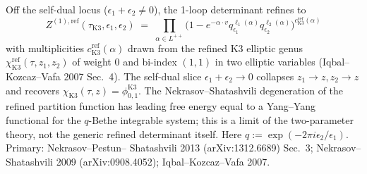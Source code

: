 \begin{remark}
\label{rem:feyn-W15-refinement}
Off the self-dual locus ($\epsilon_1 + \epsilon_2 \neq 0$), the
1-loop determinant refines to
\[
Z^{(1), \mathrm{ref}}(\tau_{\mathrm K3}, \epsilon_1, \epsilon_2)
 \;=\; \prod_{\alpha \in L^{++}}
 \bigl(1 - e^{-\alpha\cdot v} q_{\epsilon_1}^{\ell_1(\alpha)}
 q_{\epsilon_2}^{\ell_2(\alpha)}\bigr)^{c^{\mathrm{ref}}_{\mathrm K3}(\alpha)}
\]
with multiplicities $c^{\mathrm{ref}}_{\mathrm K3}(\alpha)$ drawn from
the refined K3 elliptic genus
$\chi^{\mathrm{ref}}_{\mathrm K3}(\tau, z_1, z_2)$ of weight $0$ and
bi-index $(1, 1)$ in two elliptic variables (Iqbal--Kozcaz--Vafa
2007 Sec.~4). The self-dual slice $\epsilon_1 + \epsilon_2 \to 0$
collapses $z_1 \to z, z_2 \to z$ and recovers
$\chi_{\mathrm K3}(\tau, z) = \phi_{0,1}^{\mathrm K3}$. The
Nekrasov--Shatashvili degeneration of the refined partition function
has leading free energy equal to a Yang--Yang functional for the
$q$-Bethe integrable system; this is a limit of the two-parameter
theory, not the generic refined determinant itself.  Here
$q := \exp(-2\pi i \epsilon_2 / \epsilon_1)$. Primary: Nekrasov--Pestun--
Shatashvili 2013 (arXiv:1312.6689) Sec.~3; Nekrasov--Shatashvili 2009
(arXiv:0908.4052); Iqbal--Kozcaz--Vafa 2007.
\end{remark}

